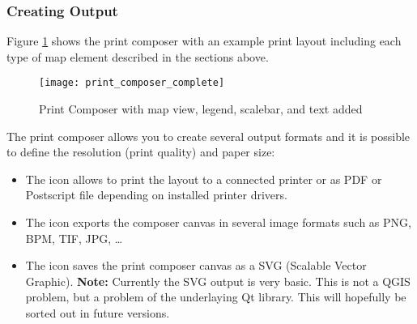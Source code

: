 \subsubsection{Creating Output}

Figure \ref{fig:print_composer_complete} shows the print composer with an example 
print layout including each type of map element described in the sections above.

\begin{figure}[h]
   \begin{center}
   \caption{Print Composer with map view, legend, scalebar, and text added}
   \label{fig:print_composer_complete}\smallskip
   \texttt{[image: print\_composer\_complete]}
\end{center}  
\end{figure}

The print composer allows you to create several output formats and it is possible to 
define the resolution (print quality) and paper size:

\begin{itemize}
\item The  icon allows to print the layout 
to a connected printer or as PDF or Postscript file depending on installed printer 
drivers.
\item The  icon exports the 
composer canvas in several image formats such as PNG, BPM, TIF, JPG, \dots
\item The  icon saves the print 
composer canvas as a SVG (Scalable Vector Graphic). \textbf{Note:} Currently the 
SVG output is very basic. This is not a QGIS problem, but a problem of the underlaying 
Qt library. This will hopefully be sorted out in future versions.
\end{itemize}

